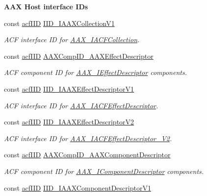 \begin{Indent}{\bf A\+A\+X Host interface I\+Ds}
\begin{DoxyCompactItemize}
const \hyperlink{a00150_a59df0b41744eee7a066787aaedf97f67}{acf\+I\+I\+D} \hyperlink{a00299_a2dbdb6a2a17831779b25bd74116ed836}{I\+I\+D\+\_\+\+I\+A\+A\+X\+Collection\+V1}
\begin{DoxyCompactList}\small\item\em A\+C\+F interface I\+D for \hyperlink{a00049}{A\+A\+X\+\_\+\+I\+A\+C\+F\+Collection}. \end{DoxyCompactList}\item 
const \hyperlink{a00150_a59df0b41744eee7a066787aaedf97f67}{acf\+I\+I\+D} \hyperlink{a00299_afd8738bffaa66c1178a0ca1172861773}{A\+A\+X\+Comp\+I\+D\+\_\+\+A\+A\+X\+Effect\+Descriptor}
\begin{DoxyCompactList}\small\item\em A\+C\+F component I\+D for \hyperlink{a00096}{A\+A\+X\+\_\+\+I\+Effect\+Descriptor} components. \end{DoxyCompactList}\item 
const \hyperlink{a00150_a59df0b41744eee7a066787aaedf97f67}{acf\+I\+I\+D} \hyperlink{a00299_a009151e7f4d79356c7e2da2b2094e5e4}{I\+I\+D\+\_\+\+I\+A\+A\+X\+Effect\+Descriptor\+V1}
\begin{DoxyCompactList}\small\item\em A\+C\+F interface I\+D for \hyperlink{a00057}{A\+A\+X\+\_\+\+I\+A\+C\+F\+Effect\+Descriptor}. \end{DoxyCompactList}\item 
const \hyperlink{a00150_a59df0b41744eee7a066787aaedf97f67}{acf\+I\+I\+D} \hyperlink{a00299_ab26eee1ffa892e6c7ca88d16f967c0da}{I\+I\+D\+\_\+\+I\+A\+A\+X\+Effect\+Descriptor\+V2}
\begin{DoxyCompactList}\small\item\em A\+C\+F interface I\+D for \hyperlink{a00058}{A\+A\+X\+\_\+\+I\+A\+C\+F\+Effect\+Descriptor\+\_\+\+V2}. \end{DoxyCompactList}\item 
const \hyperlink{a00150_a59df0b41744eee7a066787aaedf97f67}{acf\+I\+I\+D} \hyperlink{a00299_a765e040fc408fdf5c21f7078d3a38566}{A\+A\+X\+Comp\+I\+D\+\_\+\+A\+A\+X\+Component\+Descriptor}
\begin{DoxyCompactList}\small\item\em A\+C\+F component I\+D for \hyperlink{a00088}{A\+A\+X\+\_\+\+I\+Component\+Descriptor} components. \end{DoxyCompactList}\item 
const \hyperlink{a00150_a59df0b41744eee7a066787aaedf97f67}{acf\+I\+I\+D} \hyperlink{a00299_a0b4fc5adc909e67eef6a787aa2acdd7e}{I\+I\+D\+\_\+\+I\+A\+A\+X\+Component\+Descriptor\+V1}

\end{DoxyCompactItemize}
\end{Indent}
